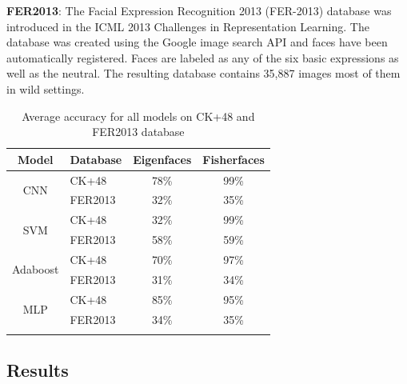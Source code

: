 \documentclass[10pt,twocolumn,letterpaper]{article}
\begin{document}
\textbf{FER2013}: The Facial Expression Recognition 2013 (FER-2013) database was introduced in the ICML 2013 Challenges in Representation Learning. \cite{Article10} The database was created using the Google image search API and faces have been automatically registered. Faces are labeled as any of the six basic expressions as well as the neutral. The resulting database contains 35,887 images most of them in wild settings. \cite{Article09}

\begin{longtable}{|c|l|c|c|}
\hline
Model                     & Database & \multicolumn{1}{l|}{Eigenfaces} & \multicolumn{1}{l|}{Fisherfaces} \\ \hline
\endhead
%
\multirow{2}{*}{CNN}      & CK+48    & 78\%                            & 99\%                             \\ \cline{2-4} 
                          & FER2013  & 32\%                            & 35\%                             \\ \hline
\multirow{2}{*}{SVM}      & CK+48    & 32\%                            & 99\%                             \\ \cline{2-4} 
                          & FER2013  & 58\%                            & 59\%                             \\ \hline
\multirow{2}{*}{Adaboost} & CK+48    & 70\%                            & 97\%                             \\ \cline{2-4} 
                          & FER2013  & 31\%                            & 34\%                             \\ \hline
\multirow{2}{*}{MLP}      & CK+48    & 85\%                            & 95\%                             \\ \cline{2-4} 
                          & FER2013  & 34\%                            & 35\%                             \\ \hline
\caption{Average accuracy for all models on CK+48 and FER2013 database}
\label{tab:my-table}
\end{longtable}

\subsection{Results}
\end{document}
